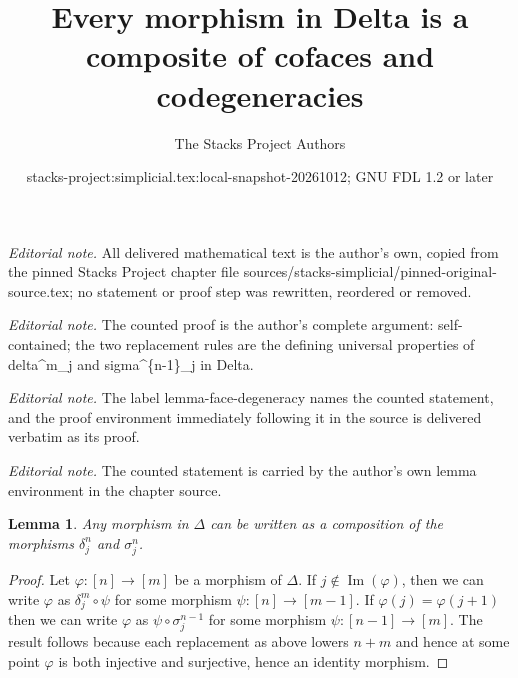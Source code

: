 \documentclass{stacks-project}
\title{Every morphism in Delta is a composite of cofaces and codegeneracies}
\author{The Stacks Project Authors}
\date{stacks-project:simplicial.tex:local-snapshot-20261012; GNU FDL 1.2 or later}
\theoremstyle{plain}
\newtheorem{lemma}[subsection]{Lemma}
\theoremstyle{definition}
\theoremstyle{remark}
\numberwithin{equation}{subsection}
\def\Im{\mathop{\mathrm{Im}}}
\begin{document}
\maketitle
\noindent\textit{Editorial note.} All delivered mathematical text is the author's own, copied from the pinned Stacks Project chapter file sources/stacks-simplicial/pinned-original-source.tex; no statement or proof step was rewritten, reordered or removed.\par\medskip
\noindent\textit{Editorial note.} The counted proof is the author's complete argument: self-contained; the two replacement rules are the defining universal properties of delta\textasciicircum{}m\_j and sigma\textasciicircum{}\{n-1\}\_j in Delta.\par\medskip
\noindent\textit{Editorial note.} The label lemma-face-degeneracy names the counted statement, and the proof environment immediately following it in the source is delivered verbatim as its proof.\par\medskip
\noindent\textit{Editorial note.} The counted statement is carried by the author's own lemma environment in the chapter source.\par\medskip
\begin{lemma}
\label{lemma-face-degeneracy}
Any morphism in $\Delta$ can be written as a composition
of the morphisms $\delta^n_j$ and $\sigma^n_j$.
\end{lemma}

\begin{proof}
Let $\varphi : [n] \to [m]$ be a morphism of $\Delta$.
If $j \not \in \Im(\varphi)$, then we can write
$\varphi$ as $\delta^m_j \circ \psi$ for some morphism
$\psi : [n] \to [m - 1]$. If $\varphi(j) = \varphi(j + 1)$
then we can write $\varphi$ as $\psi \circ \sigma^{n - 1}_j$
for some morphism $\psi : [n - 1] \to [m]$.
The result follows because each replacement
as above lowers $n + m$ and hence at some point
$\varphi$ is both injective and surjective, hence
an identity morphism.
\end{proof}
\end{document}
